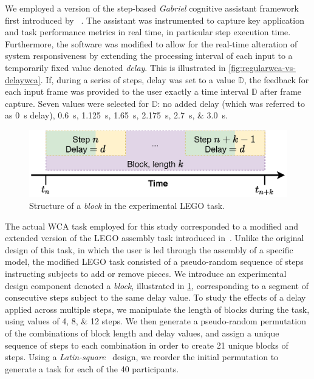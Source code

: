 We employed a version of the step-based \emph{Gabriel} cognitive assistant framework first introduced by \citeauthor{chen2018application}~\cite{chen2018application}.
The assistant was instrumented to capture key application and task performance metrics in real time, in particular step execution time.
Furthermore, the software was modified to allow for the real-time alteration of system responsiveness by extending the processing interval of each input to a temporarily fixed value denoted \emph{delay}.
This is illustrated in \cref{fig:regularwca-vs-delaywca}.
If, during a series of steps, delay was set to a value \ensuremath{\mathbb{D}}, the feedback for each input frame was provided to the user exactly a time interval \ensuremath{\mathbb{D}} after frame capture.
Seven values were selected for \ensuremath{\mathbb{D}}: no added delay (which was referred to as  \SI{0}{\second} delay), \SIlist{0.6;1.125;1.65;2.175;2.7;3.0}{\second}.

\begin{figure}[tb]
    \centering
    \includegraphics[width=.6\textwidth]{publications/2021ImpactDelayedResponse/Fig4c}
    \caption{Structure of a \emph{block} in the experimental LEGO task.}\label{fig:stepblock}
\end{figure}

The actual \gls{WCA} task employed for this study corresponded to a modified and extended version of the LEGO assembly task introduced in~\cite{chen2015early}.
Unlike the original design of this task, in which the user is led through the assembly of a specific model, the modified LEGO task consisted of a pseudo-random sequence of steps instructing subjects to add or remove pieces.
We introduce an experimental design component denoted a \emph{block}, illustrated in \cref{fig:stepblock}, corresponding to a segment of consecutive steps subject to the same delay value.
To study the effects of a delay applied across multiple steps, we manipulate the length of blocks during the task, using values of \numlist[list-final-separator={, or }]{4;8;12} steps.
We then generate a pseudo-random permutation of the combinations of block length and delay values, and assign a unique sequence of steps to each combination in order to create \num{21} unique blocks of steps.
Using a \emph{Latin-square}~\cite{keedwell2015latin} design, we reorder the initial permutation to generate a task for each of the \num{40} participants.

